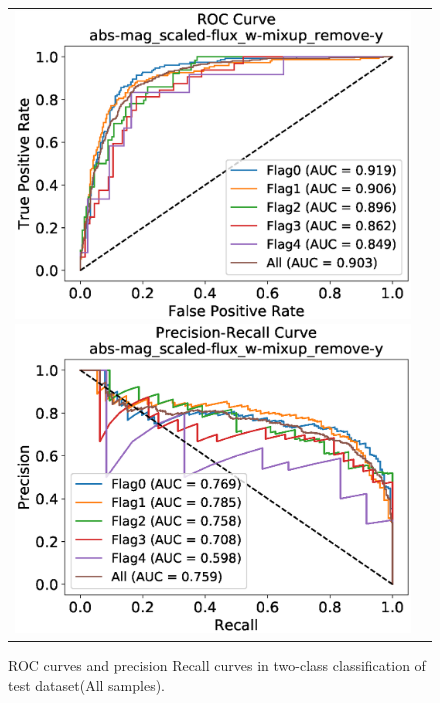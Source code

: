 \documentclass[useamsfonts]{pasj01}
\begin{document}
%
%
%
\begin{figure}[h]
    \begin{tabular}{cc}
        \begin{minipage}{0.5\hsize}
            \begin{center}
                \includegraphics[width=\columnwidth]{figures/10_abs-mag_scaled-flux_w-mixup_remove-y_predictions_test_ROC_all.eps}
            \end{center}
        \end{minipage}
        \begin{minipage}{0.5\hsize}
            \begin{center}
                \includegraphics[width=\columnwidth]{figures/10_abs-mag_scaled-flux_w-mixup_remove-y_predictions_test_PreRec_all.eps}
            \end{center}
        \end{minipage}
    \end{tabular}
    \caption{%
    ROC curves and precision Recall curves in two-class classification of test dataset(All samples).
    }
    \label{fig:h2_test_all}
\end{figure}
\end{document}
